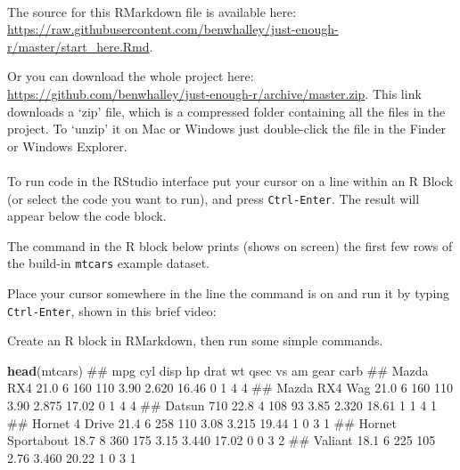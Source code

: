 \documentclass[]{article}
\newenvironment{Shaded}{\begin{snugshade}}{\end{snugshade}}
\newcommand{\KeywordTok}[1]{\textcolor[rgb]{0.13,0.29,0.53}{\textbf{#1}}}
\newcommand{\NormalTok}[1]{#1}
\let\oldparagraph\paragraph
\renewcommand{\paragraph}[1]{\oldparagraph{#1}\mbox{}}
\theoremstyle{definition}
\theoremstyle{definition}
\theoremstyle{definition}
\theoremstyle{remark}
\begin{document}
\paragraph{}\label{section-1}

The source for this RMarkdown file is available here:
\url{https://raw.githubusercontent.com/benwhalley/just-enough-r/master/start_here.Rmd}.

Or you can download the whole project here:
\url{https://github.com/benwhalley/just-enough-r/archive/master.zip}.
This link downloads a `zip' file, which is a compressed folder
containing all the files in the project. To `unzip' it on Mac or Windows
just double-click the file in the Finder or Windows Explorer.

\paragraph{}\label{section-2}

To run code in the RStudio interface put your cursor on a line within an
R Block (or select the code you want to run), and press
\texttt{Ctrl-Enter}. The result will appear below the code block.

The command in the R block below prints (shows on screen) the first few
rows of the build-in \texttt{mtcars} example dataset.

Place your cursor somewhere in the line the command is on and run it by
typing \texttt{Ctrl-Enter}, shown in this brief video:

Create an R block in RMarkdown, then run some simple commands.

\begin{Shaded}
\begin{Highlighting}[]
\KeywordTok{head}\NormalTok{(mtcars)}
\NormalTok{##                    mpg cyl disp  hp drat    wt  qsec vs am gear carb}
\NormalTok{## Mazda RX4         21.0   6  160 110 3.90 2.620 16.46  0  1    4    4}
\NormalTok{## Mazda RX4 Wag     21.0   6  160 110 3.90 2.875 17.02  0  1    4    4}
\NormalTok{## Datsun 710        22.8   4  108  93 3.85 2.320 18.61  1  1    4    1}
\NormalTok{## Hornet 4 Drive    21.4   6  258 110 3.08 3.215 19.44  1  0    3    1}
\NormalTok{## Hornet Sportabout 18.7   8  360 175 3.15 3.440 17.02  0  0    3    2}
\NormalTok{## Valiant           18.1   6  225 105 2.76 3.460 20.22  1  0    3    1}
\end{Highlighting}
\end{Shaded}
\end{document}
